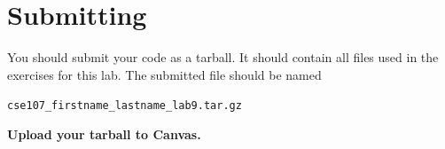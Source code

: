 \documentclass[11pt]{cselabheader}
\begin{document}
\newpage
\section{Submitting}

You should submit your code as a tarball. It should contain all files
used in the exercises for this lab. The submitted file should be named
\begin{center}
  \texttt{cse107\_firstname\_lastname\_lab9.tar.gz}
\end{center}

\begin{center}
  \textbf{Upload your tarball to Canvas.}
\end{center}

\listofexercises
\listofextraexercises
\end{document}
